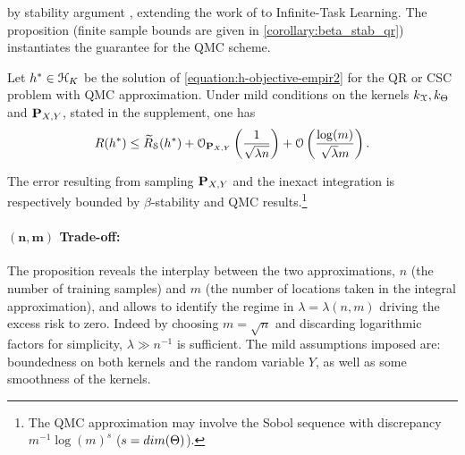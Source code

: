 by stability
argument \citep{bousquet2002stability}, extending the work of
\citet{Audiffren13} to Infinite-Task Learning. The proposition (finite sample
bounds are given in \cref{corollary:beta_stab_qr}) instantiates the guarantee
for the \ac{QMC} scheme.
%
\begin{proposition}[Generalization]%
    \label{proposition:generalization_supervised}
    Let $h^* \in \mathcal{H}_K$ be the solution of \cref{equation:h-objective-empir2} for
    the \ac{QR} or \ac{CSC} problem with \ac{QMC} approximation. Under mild
    conditions on the kernels $k_{\mathcal{X}},k_{\Theta}$ and $\mathbf{{P}}_{X,Y}$,
    stated in the supplement, one has
    {\small\begin{align}\label{equation:excess_risk}
        {\ensuremath{R}}(h^*) \leq \widetilde{R}_{\mathcal{S}}(h^*) +
        \mathcal{O}_{\mathbf{{P}}_{X,Y}} \left (\frac{1}{\sqrt{\lambda n}}
        \right ) + \mathcal{O} \left ( \frac{\log(m)}{\sqrt{\lambda}m} \right).
    \end{align}}
\end{proposition}
\begin{sproof}
    The error resulting from sampling $\mathbf{{P}}_{X, Y}$ and the inexact
    integration is respectively bounded by $\beta$-stability \citep{kadri16operator} and
    \ac{QMC} results.\footnote{The \ac{QMC} approximation may involve the Sobol
    sequence with discrepancy $m^{-1}\log(m)^s$
    ($s=dim(\Theta)$).}
\end{sproof}

\paragraph{$\mathbf{(n,m)}$ Trade-off:}
%
 The proposition reveals the interplay
  between the two approximations, $n$ (the number of training samples) and $m$
  (the number of locations taken in the integral approximation), and allows to
  identify the regime in $\lambda=\lambda(n,m)$ driving the excess risk to
  zero. Indeed by choosing $m=\sqrt{n}$ and discarding logarithmic factors for
  simplicity, $\lambda\gg n^{-1}$ is sufficient.
 The mild assumptions imposed are: boundedness on both
 kernels and the random variable $Y$, as well as some smoothness of the kernels.









%
